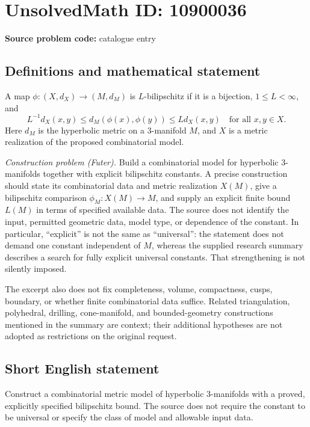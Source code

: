 \documentclass[11pt]{article}
\begin{document}
\section*{UnsolvedMath ID: 10900036}
\textbf{Source problem code:} catalogue entry
\subsection{Definitions and mathematical statement}
A map \(\phi:(X,d_X)\to(M,d_M)\) is \(L\)-bilipschitz if it is a bijection, \(1\leq L<\infty\), and
\[
 L^{-1}d_X(x,y)\leq d_M(\phi(x),\phi(y))\leq Ld_X(x,y)
 \quad\text{for all }x,y\in X.
\]
Here \(d_M\) is the hyperbolic metric on a \(3\)-manifold \(M\), and \(X\) is a metric realization of the proposed combinatorial model.

\emph{Construction problem (Futer).} Build a combinatorial model for hyperbolic \(3\)-manifolds together with explicit bilipschitz constants. A precise construction should state its combinatorial data and metric realization \(X(M)\), give a bilipschitz comparison \(\phi_M:X(M)\to M\), and supply an explicit finite bound \(L(M)\) in terms of specified available data. The source does not identify the input, permitted geometric data, model type, or dependence of the constant. In particular, ``explicit'' is not the same as ``universal'': the statement does not demand one constant independent of \(M\), whereas the supplied research summary describes a search for fully explicit universal constants. That strengthening is not silently imposed.

The excerpt also does not fix completeness, volume, compactness, cusps, boundary, or whether finite combinatorial data suffice. Related triangulation, polyhedral, drilling, cone-manifold, and bounded-geometry constructions mentioned in the summary are context; their additional hypotheses are not adopted as restrictions on the original request.
\subsection{Short English statement}
Construct a combinatorial metric model of hyperbolic \(3\)-manifolds with a proved, explicitly specified bilipschitz bound. The source does not require the constant to be universal or specify the class of model and allowable input data.
\end{document}
